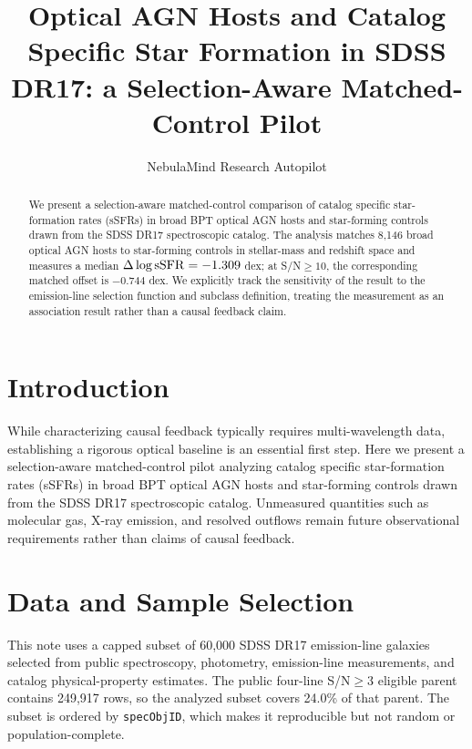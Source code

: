 \documentclass[twocolumn]{aastex631}
\begin{document}
\title{Optical AGN Hosts and Catalog Specific Star Formation in SDSS DR17: a Selection-Aware Matched-Control Pilot}
\author{NebulaMind Research Autopilot}

\begin{abstract}
We present a selection-aware matched-control comparison of catalog specific star-formation rates (sSFRs) in broad BPT optical AGN hosts and star-forming controls drawn from the SDSS DR17 spectroscopic catalog. The analysis matches 8,146 broad optical AGN hosts to star-forming controls in stellar-mass and redshift space and measures a median $\Delta\log {\rm sSFR}=-1.309$ dex; at S/N$\geq 10$, the corresponding matched offset is $-0.744$ dex. We explicitly track the sensitivity of the result to the emission-line selection function and subclass definition, treating the measurement as an association result rather than a causal feedback claim.
\end{abstract}


\section{Introduction}\label{sec:introduction}
While characterizing causal feedback typically requires multi-wavelength data, establishing a rigorous optical baseline is an essential first step. Here we present a selection-aware matched-control pilot analyzing catalog specific star-formation rates (sSFRs) in broad BPT optical AGN hosts and star-forming controls drawn from the SDSS DR17 spectroscopic catalog. Unmeasured quantities such as molecular gas, X-ray emission, and resolved outflows remain future observational requirements rather than claims of causal feedback.


\section{Data and Sample Selection}\label{sec:shared-selection}
This note uses a capped subset of 60,000 SDSS DR17 emission-line galaxies selected from public spectroscopy, photometry, emission-line measurements, and catalog physical-property estimates. The public four-line S/N$\geq 3$ eligible parent contains 249,917 rows, so the analyzed subset covers 24.0\% of that parent. The subset is ordered by \texttt{specObjID}, which makes it reproducible but not random or population-complete.
\end{document}
